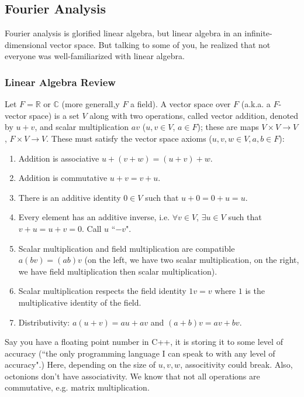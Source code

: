 \documentclass{article}
\theoremstyle{plain}
\theoremstyle{remark}
\newcommand{\R}{{\mathbb R}}
\newcommand{\C}{{\mathbb C}}
\begin{document}
\subsection{Fourier Analysis}
Fourier analysis is glorified linear algebra,
but linear algebra in an infinite-dimensional vector space.
But talking to some of you, he realized that not everyone
was well-familiarized with linear algebra.

\subsubsection{Linear Algebra Review}
Let $F = \R$ or $\C$ (more generall,y $F$ a field).
A vector space over $F$ (a.k.a. a $F$-vector space)
is a set $V$ along with two operations, called vector addition,
denoted by $u + v$, and scalar multiplication $av$
($u,v \in V$, $a \in F$);
these are maps $V \times V \to V$, $F \times V \to V$.
These must satisfy the vector space axioms
($u,v,w \in V, a,b \in F$):
\begin{enumerate}
	\item Addition is associative $u + (v + w) = (u + v) + w$.
	\item Addition is commutative $u + v = v + u$.
	\item There is an additive identity $0\in V$ such that $u + 0 = 0 + u = u$.
	\item Every element has an additive inverse,
		i.e. $\forall v \in V$, $\exists u \in V$ such that
		$v + u = u + v = 0$. Call $u$ ``$-v$".
	\item Scalar multiplication and field multiplication are compatible
		$a(bv) = (ab)v$
		(on the left, we have two scalar multiplication,
		on the right, we have field multiplication then scalar multiplication).
	\item Scalar multiplication respects the field identity
		$1v = v$ where $1$ is the multiplicative identity of the field.
	\item Distributivity: $a(u+v) = au + av$ and $(a + b)v = av + bv$.
\end{enumerate}
Say you have a floating point number in C++,
it is storing it to some level of accuracy
(``the only programming language I can speak to with any level of accuracy".)
Here, depending on the size of $u,v,w$, associtivity could break.
Also, octonions don't have associativity.
We know that not all operations are commutative, e.g. matrix multiplication.
\end{document}
